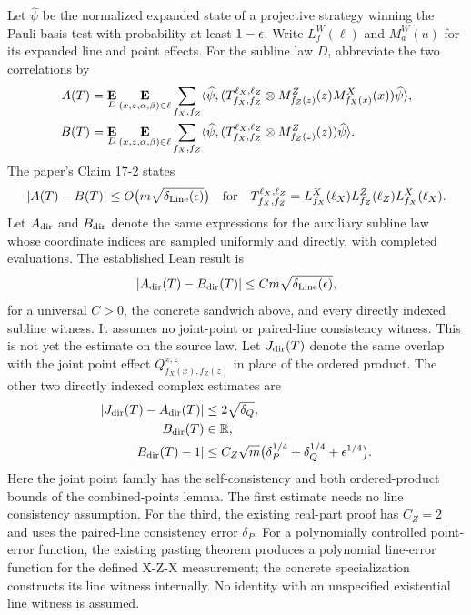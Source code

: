 \documentclass[11pt]{article}
\begin{document}
Let $\widehat\psi$ be the normalized expanded state of a projective strategy
winning the Pauli basis test with probability at least $1-\epsilon$. Write
$L^W_f(\ell)$ and $M^W_a(u)$ for its expanded line and point effects. For
the subline law $D$, abbreviate the two correlations by
\begin{align*}
 A(T)&=\mathop{\bf E\/}_D\mathop{\bf E\/}_{(x,z,\alpha,\beta)\in\ell}
   \sum_{f_X,f_Z}\langle\widehat\psi,
   (T^{\ell_X,\ell_Z}_{f_X,f_Z}\otimes
     M^Z_{f_Z(z)}(z)M^X_{f_X(x)}(x))\widehat\psi\rangle,\\
 B(T)&=\mathop{\bf E\/}_D\mathop{\bf E\/}_{(x,z,\alpha,\beta)\in\ell}
   \sum_{f_X,f_Z}\langle\widehat\psi,
   (T^{\ell_X,\ell_Z}_{f_X,f_Z}\otimes
     M^Z_{f_Z(z)}(z))\widehat\psi\rangle.
\end{align*}
The paper's Claim 17-2 states
\[
 |A(T)-B(T)|\leq O\bigl(m\sqrt{\delta_{\mathrm{Line}}(\epsilon)}\bigr)
 \quad\text{for}\quad
 T^{\ell_X,\ell_Z}_{f_X,f_Z}
 =L^X_{f_X}(\ell_X)L^Z_{f_Z}(\ell_Z)L^X_{f_X}(\ell_X).
\]
Let $A_{\rm dir}$ and $B_{\rm dir}$ denote the same expressions for the
auxiliary subline law whose coordinate indices are sampled uniformly and
directly, with completed evaluations. The established Lean result is
\[
 |A_{\rm dir}(T)-B_{\rm dir}(T)|
 \le C m\sqrt{\delta_{\mathrm{Line}}(\epsilon)},
\]
for a universal $C>0$, the concrete sandwich above, and every directly
indexed subline witness. It assumes no joint-point or paired-line
consistency witness. This is not yet the estimate on the source law.
Let $J_{\rm dir}(T)$ denote the same overlap with the joint point effect
$Q^{x,z}_{f_X(x),f_Z(z)}$ in place of the ordered product. The other two
directly indexed complex estimates are
\begin{align*}
 |J_{\rm dir}(T)-A_{\rm dir}(T)|&\leq 2\sqrt{\delta_Q},\\
 B_{\rm dir}(T)&\in\mathbb R,\\
 |B_{\rm dir}(T)-1|&\leq
 C_Z\sqrt m\bigl(\delta_P^{1/4}+\delta_Q^{1/4}+\epsilon^{1/4}\bigr).
\end{align*}
Here the joint point family has the self-consistency and both ordered-product
bounds of the combined-points lemma. The first estimate needs no line
consistency assumption. For the third, the existing real-part proof has
$C_Z=2$ and uses the paired-line consistency error $\delta_P$. For a
polynomially controlled point-error function, the existing pasting theorem
produces a polynomial line-error function for the defined X-Z-X measurement;
the concrete specialization constructs its line witness internally.
No identity with an unspecified existential line witness is assumed.
\end{document}
